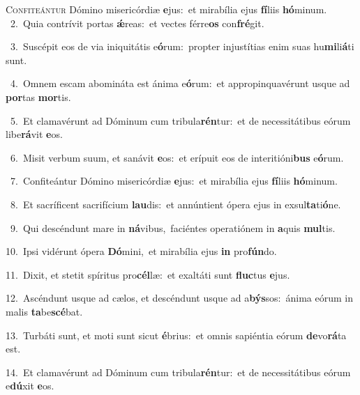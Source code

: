 \lettrine{\initial\textcolor{\initialcolor}{C}}{onfiteántur} Dómino misericórdiæ \textbf{e}\-jus:~\star et mirabília ejus \textbf{fí}\-liis \textbf{hó}\-minum.\\
{\numbfont\textcolor{\numbcolor}{~2.}}~Quia contrívit portas \textbf{ǽ}\-reas:~\star et vectes férre\textbf{os} con\-\textbf{fré}\-git.\par
{\numbfont\textcolor{\numbcolor}{~3.}}~Suscépit eos de via iniquitátis e\-\textbf{ó}\-rum:~\star propter injustítias enim suas hu\-\textbf{mi}\-li\-\textbf{á}\-ti sunt.\par
{\numbfont\textcolor{\numbcolor}{~4.}}~Omnem escam abomináta est ánima e\-\textbf{ó}\-rum:~\star et appropinquavérunt usque ad \textbf{por}\-tas \textbf{mor}\-tis.\par
{\numbfont\textcolor{\numbcolor}{~5.}}~Et clamavérunt ad Dóminum cum tribula\-\textbf{rén}\-tur:~\star et de necessitátibus eórum libe\-\textbf{rá}\-vit \textbf{e}\-os.\par
{\numbfont\textcolor{\numbcolor}{~6.}}~Misit verbum suum, et sanávit \textbf{e}\-os:~\star et erípuit eos de interitióni\textbf{bus} e\-\textbf{ó}\-rum.\par
{\numbfont\textcolor{\numbcolor}{~7.}}~Confiteántur Dómino misericórdiæ \textbf{e}\-jus:~\star et mirabília ejus \textbf{fí}\-liis \textbf{hó}\-minum.\par
{\numbfont\textcolor{\numbcolor}{~8.}}~Et sacríficent sacrifícium \textbf{lau}\-dis:~\star et annúntient ópera ejus in exsul\-\textbf{ta}\-ti\-\textbf{ó}\-ne.\par
{\numbfont\textcolor{\numbcolor}{~9.}}~Qui descéndunt mare in \textbf{ná}\-vibus,~\star faciéntes operatiónem in \textbf{a}\-quis \textbf{mul}\-tis.\par
{\numbfont\textcolor{\numbcolor}{10.}}~Ipsi vidérunt ópera \textbf{Dó}\-mini,~\star et mirabília ejus \textbf{in} pro\-\textbf{fún}\-do.\par
{\numbfont\textcolor{\numbcolor}{11.}}~Dixit, et stetit spíritus pro\-\textbf{cél}\-læ:~\star et exaltáti sunt \textbf{fluc}\-tus \textbf{e}\-jus.\par
{\numbfont\textcolor{\numbcolor}{12.}}~Ascéndunt usque ad cælos, et descéndunt usque ad a\-\textbf{býs}\-sos:~\star ánima eórum in malis \textbf{ta}\-be\-\textbf{scé}\-bat.\par
{\numbfont\textcolor{\numbcolor}{13.}}~Turbáti sunt, et moti sunt sicut \textbf{é}\-brius:~\star et omnis sapiéntia eórum \textbf{de}\-vo\-\textbf{rá}\-ta est.\par
{\numbfont\textcolor{\numbcolor}{14.}}~Et clamavérunt ad Dóminum cum tribula\-\textbf{rén}\-tur:~\star et de necessitátibus eórum e\-\textbf{dú}\-xit \textbf{e}\-os.\par
